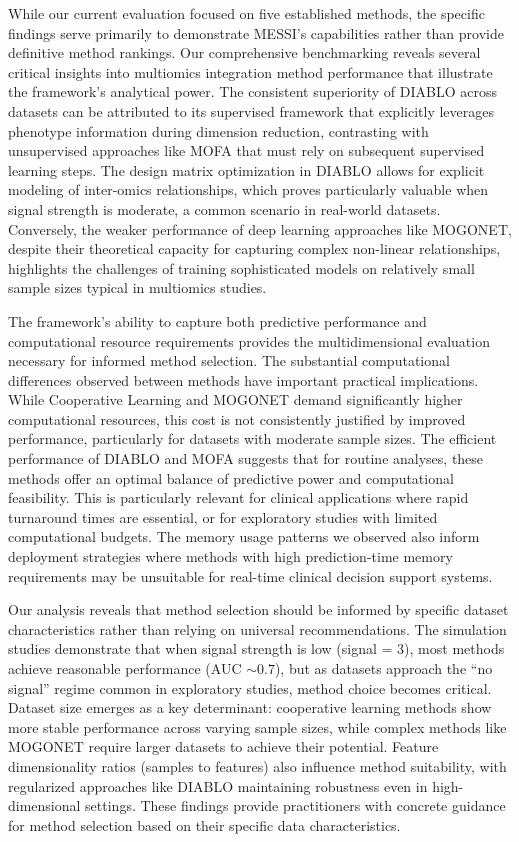 \documentclass[
]{article}
\begin{document}
While our current evaluation focused on five established methods, the specific findings serve primarily to demonstrate MESSI's capabilities rather than provide definitive method rankings. Our comprehensive benchmarking reveals several critical insights into multiomics integration method performance that illustrate the framework's analytical power. The consistent superiority of DIABLO across datasets can be attributed to its supervised framework that explicitly leverages phenotype information during dimension reduction, contrasting with unsupervised approaches like MOFA that must rely on subsequent supervised learning steps. The design matrix optimization in DIABLO allows for explicit modeling of inter-omics relationships, which proves particularly valuable when signal strength is moderate, a common scenario in real-world datasets. Conversely, the weaker performance of deep learning approaches like MOGONET, despite their theoretical capacity for capturing complex non-linear relationships, highlights the challenges of training sophisticated models on relatively small sample sizes typical in multiomics studies.

The framework's ability to capture both predictive performance and computational resource requirements provides the multidimensional evaluation necessary for informed method selection. The substantial computational differences observed between methods have important practical implications. While Cooperative Learning and MOGONET demand significantly higher computational resources, this cost is not consistently justified by improved performance, particularly for datasets with moderate sample sizes. The efficient performance of DIABLO and MOFA suggests that for routine analyses, these methods offer an optimal balance of predictive power and computational feasibility. This is particularly relevant for clinical applications where rapid turnaround times are essential, or for exploratory studies with limited computational budgets. The memory usage patterns we observed also inform deployment strategies where methods with high prediction-time memory requirements may be unsuitable for real-time clinical decision support systems.

Our analysis reveals that method selection should be informed by specific dataset characteristics rather than relying on universal recommendations. The simulation studies demonstrate that when signal strength is low (signal = 3), most methods achieve reasonable performance (AUC \(\sim 0.7\)), but as datasets approach the ``no signal'' regime common in exploratory studies, method choice becomes critical. Dataset size emerges as a key determinant: cooperative learning methods show more stable performance across varying sample sizes, while complex methods like MOGONET require larger datasets to achieve their potential. Feature dimensionality ratios (samples to features) also influence method suitability, with regularized approaches like DIABLO maintaining robustness even in high-dimensional settings. These findings provide practitioners with concrete guidance for method selection based on their specific data characteristics.
\end{document}
